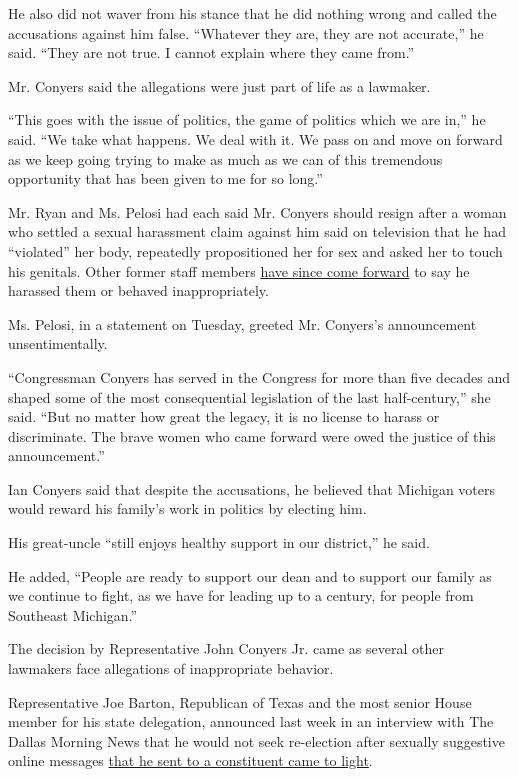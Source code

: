 He also did not waver from his stance that he did nothing wrong and
called the accusations against him false. ``Whatever they are, they are
not accurate,'' he said. ``They are not true. I cannot explain where
they came from.''

Mr. Conyers said the allegations were just part of life as a lawmaker.

``This goes with the issue of politics, the game of politics which we
are in,'' he said. ``We take what happens. We deal with it. We pass on
and move on forward as we keep going trying to make as much as we can of
this tremendous opportunity that has been given to me for so long.''

Mr. Ryan and Ms. Pelosi had each said Mr. Conyers should resign after a
woman who settled a sexual harassment claim against him said on
television that he had ``violated'' her body, repeatedly propositioned
her for sex and asked her to touch his genitals. Other former staff
members
\href{https://www.nytimes3xbfgragh.onion/2017/11/28/us/politics/conyers-sexual-harassment-democrats-pelosi.html}{have
since come forward} to say he harassed them or behaved inappropriately.

Ms. Pelosi, in a statement on Tuesday, greeted Mr. Conyers's
announcement unsentimentally.

``Congressman Conyers has served in the Congress for more than five
decades and shaped some of the most consequential legislation of the
last half-century,'' she said. ``But no matter how great the legacy, it
is no license to harass or discriminate. The brave women who came
forward were owed the justice of this announcement.''

Ian Conyers said that despite the accusations, he believed that Michigan
voters would reward his family's work in politics by electing him.

His great-uncle ``still enjoys healthy support in our district,'' he
said.

He added, ``People are ready to support our dean and to support our
family as we continue to fight, as we have for leading up to a century,
for people from Southeast Michigan.''

The decision by Representative John Conyers Jr. came as several other
lawmakers face allegations of inappropriate behavior.

Representative Joe Barton, Republican of Texas and the most senior House
member for his state delegation, announced last week in an interview
with The Dallas Morning News that he would not seek re-election after
sexually suggestive online messages
\href{https://www.nytimes3xbfgragh.onion/2017/11/22/us/politics/joe-barton-explicit-photo-twitter.html}{that
he sent to a constituent came to light}.

